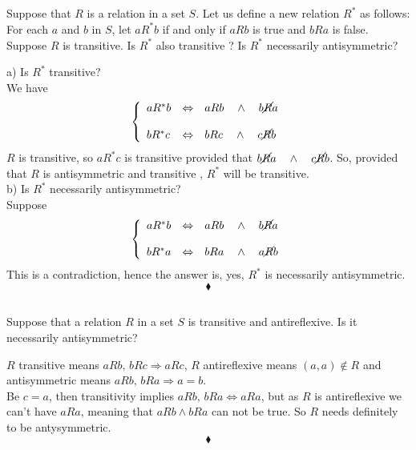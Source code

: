 \subsection{}
\begin{tcolorbox}
Suppose that $R$ is a relation in a set $S$. Let us define a new relation $R^{*}$  as follows: For each $a$ and $b$ in $S$, let $a R^{*}b$ if and only if $a R b$ is true  and $b R a$ is false. Suppose $R$ is transitive.  Is $R^{*}$ also transitive ? Is $R^{*}$ necessarily antisymmetric? 
\end{tcolorbox}
$$ $$
a) Is $R^*$ transitive?\\
We have 
\begin{align*}
\left\{\begin{array}{lll}
aR^*b&\Leftrightarrow& aRb\quad \wedge \quad b\cancel{R} a\\\\
bR^*c&\Leftrightarrow& bRc\quad \wedge \quad c\cancel{R}b
\end{array}\right.
\end{align*}
$R$ is transitive, so $a R^* c$ is transitive provided that $b\cancel{R} a\quad \wedge \quad c\cancel{R} b$. So, provided that $R$ is antisymmetric and transitive , $R^*$ will be transitive.\\
b) Is $R^{*}$ necessarily antisymmetric? \\
Suppose 
\begin{align*}
\left\{\begin{array}{lll}
aR^*b&\Leftrightarrow& aRb\quad \wedge \quad b\cancel{R} a\\\\
bR^*a&\Leftrightarrow& bRa\quad \wedge \quad a\cancel{R}b
\end{array}\right.
\end{align*}
This is a contradiction, hence the answer is, yes, $R^{*}$ is necessarily antisymmetric.
$$\blacklozenge$$


\subsection{}
\begin{tcolorbox}
 Suppose that a relation $R$ in a set $S$ is transitive and antireflexive. Is it necessarily antisymmetric? 
\end{tcolorbox}
$$ $$
$R$ transitive means $aRb,\, bRc \Rightarrow aRc$, $R$ antireflexive means $(a,a)\not\in R$ and antisymmetric means $aRb,\, bRa \Rightarrow a=b$. \\
Be $c=a$, then transitivity implies $aRb,\, bRa \Leftrightarrow aRa$, but as $R$ is antireflexive we can't have $aRa$, meaning that $aRb\wedge bRa$ can not be true. So $R$ needs definitely to be antysymmetric.
$$\blacklozenge$$

